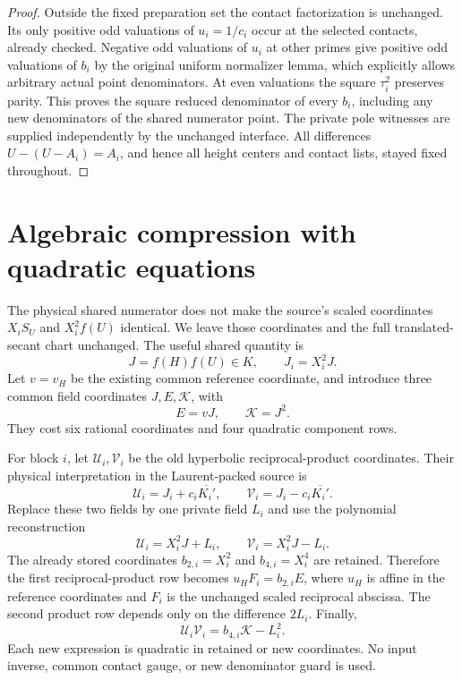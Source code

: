 \documentclass[11pt]{article}
\begin{document}
\begin{proof}
Outside the fixed preparation set the contact factorization is
unchanged. Its only positive odd valuations of $u_i=1/c_i$ occur
at the selected contacts, already checked. Negative odd valuations
of $u_i$ at other primes give positive odd valuations of $b_i$ by
the original uniform normalizer lemma, which explicitly allows
arbitrary actual point denominators. At even valuations the square
$\tau_i^2$ preserves parity. This proves the square reduced
denominator of every $b_i$, including any new denominators of the
shared numerator point. The private pole witnesses are supplied
independently by the unchanged interface. All differences
$U-(U-A_i)=A_i$, and hence all height centers and contact lists,
stayed fixed throughout.
\end{proof}

\section{Algebraic compression with quadratic equations}

The physical shared numerator does not make the source's scaled
coordinates $X_i S_U$ and $X_i^2 f(U)$ identical. We leave those
coordinates and the full translated-secant chart unchanged.
The useful shared quantity is
\[
                  J=f(H)f(U)\in K,
             \qquad J_i=X_i^2J.
\]
Let $v=v_H$ be the existing common reference coordinate, and introduce
three common field coordinates $J,E,\mathcal K$, with
\begin{equation}\label{eq:common-coefficients}
                         E=vJ,\qquad \mathcal K=J^2.
\end{equation}
They cost six rational coordinates and four quadratic component rows.

For block $i$, let $\mathcal U_i,\mathcal V_i$ be the old hyperbolic
reciprocal-product coordinates. Their physical interpretation in the
Laurent-packed source is
\[
 \mathcal U_i=J_i+c_i\overline{K_i'},\qquad
 \mathcal V_i=J_i-c_i\overline{K_i'}.
\]
Replace these two fields by one private field $L_i$ and use the
polynomial reconstruction
\begin{equation}\label{eq:lift}
        \mathcal U_i=X_i^2J+L_i,\qquad
        \mathcal V_i=X_i^2J-L_i.
\end{equation}
The already stored coordinates $b_{2,i}=X_i^2$ and $b_{4,i}=X_i^4$
are retained. Therefore the first reciprocal-product row becomes
$u_HF_i=b_{2,i}E$, where $u_H$ is affine in the reference coordinates
and $F_i$ is the unchanged scaled reciprocal abscissa. The second
product row depends only on the difference $2L_i$. Finally,
\begin{equation}\label{eq:difference-squares}
           \mathcal U_i\mathcal V_i=b_{4,i}\mathcal K-L_i^2.
\end{equation}
Each new expression is quadratic in retained or new coordinates.
No input inverse, common contact gauge, or new denominator guard is used.
\end{document}

